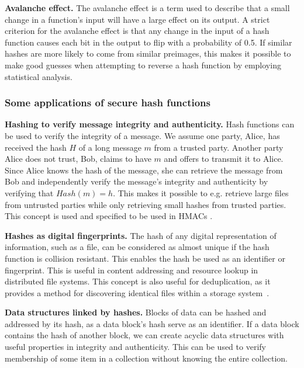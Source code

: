 {\bf Avalanche effect.}
The avalanche effect is a term used to describe that a small change in a function's input will have a large effect on its output. A strict criterion for the avalanche effect is that any change in the input of a hash function causes each bit in the output to flip with a probability of 0.5. If similar hashes are more likely to come from similar preimages, this makes it possible to make good guesses when attempting to reverse a hash function by employing statistical analysis.

\subsubsection{Some applications of secure hash functions}

{\bf Hashing to verify message integrity and authenticity.}
Hash functions can be used to verify the integrity of a message. We assume one party, Alice, has received the hash $H$ of a long message $m$ from a trusted party. Another party Alice does not trust, Bob, claims to have $m$ and offers to transmit it to Alice. Since Alice knows the hash of the message, she can retrieve the message from Bob and independently verify the message's integrity and authenticity by verifying that $Hash(m) = h$. This makes it possible to e.g. retrieve large files from untrusted parties while only retrieving small hashes from trusted parties. This concept is used and specified to be used in HMACs \cite[p.~158--164]{lindell2014introduction}.

{\bf Hashes as digital fingerprints.}
The hash of any digital representation of information, such as a file, can be considered as almost unique if the hash function is collision resistant. This enables the hash be used as an identifier or fingerprint. This is useful in content addressing and resource lookup in distributed file systems. This concept is also useful for deduplication, as it provides a method for discovering identical files within a storage system~\cite[p.~182-183]{lindell2014introduction}. 

{\bf Data structures linked by hashes.}
Blocks of data can be hashed and addressed by its hash, as a data block's hash serve as an identifier. If a data block contains the hash of another block, we can create acyclic data structures with useful properties in integrity and authenticity. This can be used to verify membership of some item in a collection without knowing the entire collection.

